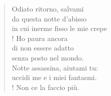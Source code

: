 \begin{verse}
Odiato ritorno, salvami\\
da questa notte d'abisso\\
in cui inerme fisso le mie crepe\\!
Ho paura ancora\\
di non essere adatto\\
senza posto nel mondo.\\
Notte assassina, aiutami tu:\\
uccidi me e i miei fantasmi.\\!
Non ce la faccio più.
\end{verse}